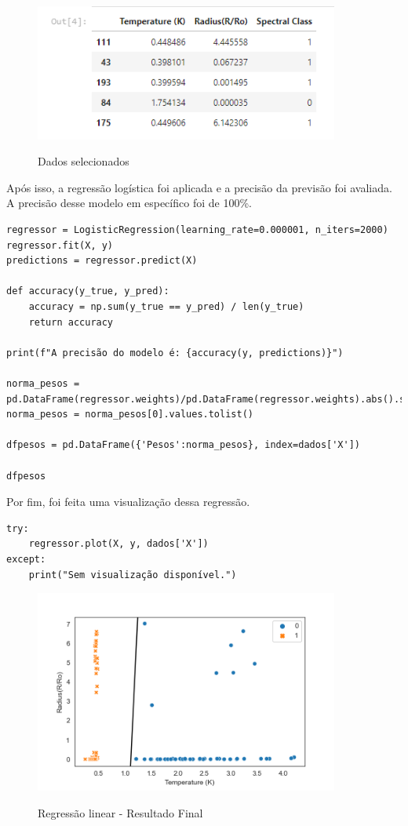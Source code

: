\documentclass[12pt]{article}
\begin{document}
\begin{figure}[h]
\caption{Dados selecionados}
\centering
\includegraphics[width=10cm]{out1.png}
\label{figura:out1}
\end{figure}

Após isso, a regressão logística foi aplicada e a precisão da previsão foi avaliada. A precisão desse modelo em específico foi de 100\%.
\\
\begin{lstlisting}
regressor = LogisticRegression(learning_rate=0.000001, n_iters=2000)
regressor.fit(X, y)
predictions = regressor.predict(X)

def accuracy(y_true, y_pred):
    accuracy = np.sum(y_true == y_pred) / len(y_true)
    return accuracy

print(f"A precisão do modelo é: {accuracy(y, predictions)}")

norma_pesos = pd.DataFrame(regressor.weights)/pd.DataFrame(regressor.weights).abs().sum()
norma_pesos = norma_pesos[0].values.tolist()

dfpesos = pd.DataFrame({'Pesos':norma_pesos}, index=dados['X'])

dfpesos
\end{lstlisting}

Por fim, foi feita uma visualização dessa regressão.
\\
\begin{lstlisting}
try:
    regressor.plot(X, y, dados['X'])
except:
    print("Sem visualização disponível.")
\end{lstlisting}

\begin{figure}[h]
\caption{Regressão linear - Resultado Final}
\centering
\includegraphics[width=10cm]{teste.png}
\label{figura:regressao_linear}
\end{figure}
\end{document}
